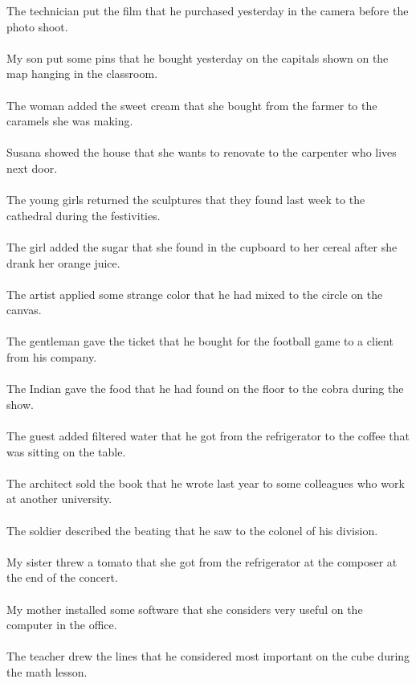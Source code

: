 The technician put the film that he purchased yesterday in the camera before the photo shoot.	\\	\\
My son put some pins that he bought yesterday on the capitals shown on the map hanging in the classroom.	\\	\\
The woman added the sweet cream that she bought from the farmer to the caramels she was making.	\\	\\
Susana showed the house that she wants to renovate to the carpenter who lives next door.	\\	\\
The young girls returned the sculptures that they found last week to the cathedral during the festivities.	\\	\\
The girl added the sugar that she found in the cupboard to her cereal after she drank her orange juice.	\\	\\
The artist applied some strange color that he had mixed to the circle on the canvas.	\\	\\
The gentleman gave the ticket that he bought for the football game to a client from his company.	\\	\\
The Indian gave the food that he had found on the floor to the cobra during the show.	\\	\\
The guest added filtered water that he got from the refrigerator to the coffee that was sitting on the table.	\\	\\
The architect sold the book that he wrote last year to some colleagues who work at another university.	\\	\\
The soldier described the beating that he saw to the colonel of his division.	\\	\\
My sister threw a tomato that she got from the refrigerator at the composer at the end of the concert.	\\	\\
My mother installed some software that she considers very useful on the computer in the office.	\\	\\
The teacher drew the lines that he considered most important on the cube during the math lesson.	\\	\\
